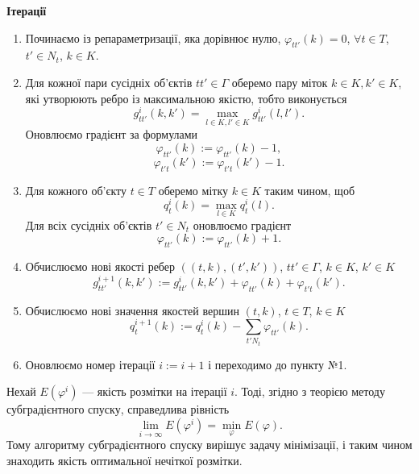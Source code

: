 \textbf{Ітерації}
\begin{enumerate}
    \item Починаємо із репараметризації, яка дорівнює нулю, $\varphi_{tt'}(k)=0$, $\forall t\in T$, $t'\in N_t$, $k\in K$.
    \item Для кожної пари сусідніх об'єктів $tt'\in\Gamma$ оберемо пару міток $k\in K, k'\in K$, які утворюють ребро
    із максимальною якістю, тобто виконується 
    \begin{equation}
        g^i_{tt'}(k,k') = \max\limits_{l\in K, l'\in K}g^i_{tt'}(l,l').
    \end{equation}
    Оновлюємо градієнт за формулами
    \begin{equation}
        \varphi_{tt'}(k):=\varphi_{tt'}(k)-1,
    \end{equation}
    \begin{equation}
        \varphi_{t't}(k'):=\varphi_{t't}(k')-1.
    \end{equation}
    \item Для кожного об'єкту $t\in T$ оберемо мітку $k\in K$ таким чином, щоб
    \begin{equation}
        q^i_t(k) = \max_{l\in K} q^i_t(l).
    \end{equation}
    Для всіх сусідніх об'єктів $t'\in N_t$ оновлюємо градієнт
    \begin{equation}
        \varphi_{tt'}(k):=\varphi_{tt'}(k)+1.
    \end{equation}
    \item  Обчислюємо нові якості ребер $((t,k),(t',k'))$, $tt'\in\Gamma$, $k\in K$, $k'\in K$
    \begin{equation}
        g^{i+1}_{tt'}(k,k') := g^i_{tt'}(k,k') + \varphi_{tt'}(k) + \varphi_{t't}(k').
    \end{equation}
    \item Обчислюємо нові значення якостей вершин $(t,k)$, $t\in T$, $k\in K$
    \begin{equation}
        q^{i+1}_t(k) :=  q^{i}_t(k) - \sum\limits_{t'N_t}\varphi_{tt'}(k).
    \end{equation}
    \item Оновлюємо номер ітерації $i:=i+1$ і переходимо до пункту №1.
\end{enumerate}

Нехай $E(\varphi^i)$ --- якість розмітки на ітерації $i$. Тоді, згідно з теорією
методу субградієнтного спуску, справедлива рівність \cite{Shor1985}
\begin{equation}
    \lim_{i\rightarrow\infty}E(\varphi^i) = \min_{\varphi}E(\varphi).
\end{equation}
Тому алгоритму субградієнтного спуску вирішує задачу мінімізації, і таким чином
знаходить якість оптимальної нечіткої розмітки.

